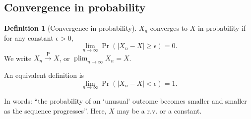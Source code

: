\documentclass[
]{book}
\DeclareMathOperator*{\plim}{plim}
\theoremstyle{definition}
\newtheorem{definition}{Definition}[chapter]
\theoremstyle{definition}
\theoremstyle{definition}
\theoremstyle{definition}
\theoremstyle{remark}
\begin{document}
\hypertarget{convergence-in-probability}{%
\subsection{Convergence in probability}\label{convergence-in-probability}}

\begin{definition}[Convergence in probability]
\(X_n\) converges to \(X\) in probability if for any constant \(\epsilon>0\),
\[\lim_{n\to\infty} \Pr(|X_n-X|\geq\epsilon) = 0.\]
We write
\(X_n\xrightarrow{\text{P}}X\), or \(\plim_{n\to\infty}X_n = X\).
\end{definition}

An equivalent definition is
\[
  \lim_{n\to\infty}\Pr(|X_n-X| < \epsilon)  = 1.
\]

In words: ``the probability of an `unusual' outcome becomes smaller and smaller as the sequence progresses''.
Here, \(X\) may be a r.v. or a constant.
\end{document}

